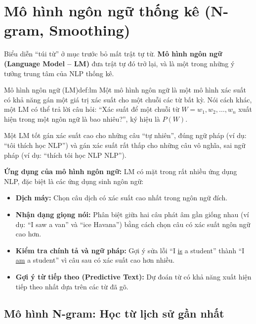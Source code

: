 
\section{Mô hình ngôn ngữ thống kê (N-gram, Smoothing)}
\label{sec:statistical_lm}

Biểu diễn “túi từ” ở mục trước bỏ mất trật tự từ. \textbf{Mô hình ngôn ngữ (Language Model -- LM)} đưa trật tự đó trở lại, và là một trong những ý tưởng trung tâm của NLP thống kê.

\begin{definition}{Mô hình ngôn ngữ (LM)}{def:lm}
    Một mô hình ngôn ngữ là một mô hình xác suất có khả năng gán một giá trị xác suất cho một chuỗi các từ bất kỳ. Nói cách khác, một LM có thể trả lời câu hỏi: “Xác suất để một chuỗi từ $W = w_1, w_2, \dots, w_n$ xuất hiện trong một ngôn ngữ là bao nhiêu?”, ký hiệu là $P(W)$.
\end{definition}

Một LM tốt gán xác suất cao cho những câu “tự nhiên”, đúng ngữ pháp (ví dụ: “tôi thích học NLP”) và gán xác suất rất thấp cho những câu vô nghĩa, sai ngữ pháp (ví dụ: “thích tôi học NLP NLP”).

\textbf{Ứng dụng của mô hình ngôn ngữ:}
LM có mặt trong rất nhiều ứng dụng NLP, đặc biệt là các ứng dụng sinh ngôn ngữ:
\begin{itemize}
    \item \textbf{Dịch máy:} Chọn câu dịch có xác suất cao nhất trong ngôn ngữ đích.
    \item \textbf{Nhận dạng giọng nói:} Phân biệt giữa hai câu phát âm gần giống nhau (ví dụ: “I saw a van” và “ice Havana”) bằng cách chọn câu có xác suất ngôn ngữ cao hơn.
    \item \textbf{Kiểm tra chính tả và ngữ pháp:} Gợi ý sửa lỗi “I \underline{is} a student” thành “I \underline{am} a student” vì câu sau có xác suất cao hơn nhiều.
    \item \textbf{Gợi ý từ tiếp theo (Predictive Text):} Dự đoán từ có khả năng xuất hiện tiếp theo nhất dựa trên các từ đã gõ.
\end{itemize}

\subsection{Mô hình N-gram: Học từ lịch sử gần nhất}
\label{ssec:ngram}

